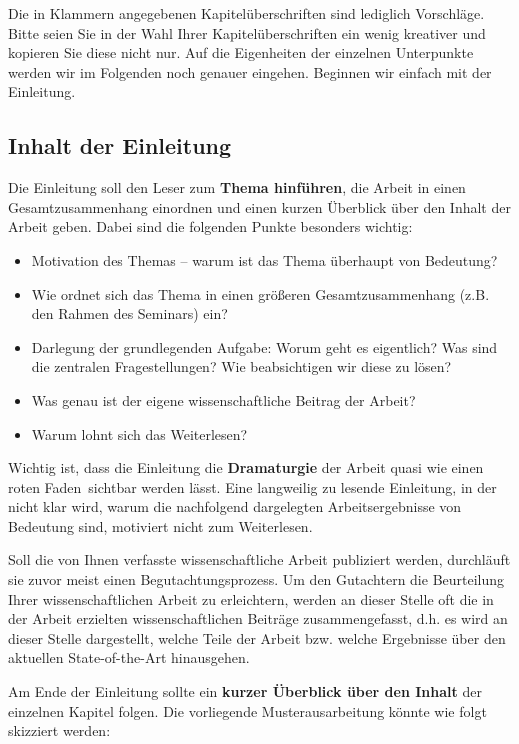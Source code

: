 Die in Klammern angegebenen Kapitelüberschriften sind lediglich \glqq Vorschläge\grqq .
Bitte seien Sie in der Wahl Ihrer Kapitelüberschriften ein wenig kreativer und kopieren Sie diese nicht nur. 
Auf die Eigenheiten der einzelnen Unterpunkte werden wir im Folgenden noch genauer eingehen.
Beginnen wir einfach mit der Einleitung.

\subsection{Inhalt der Einleitung}
Die Einleitung soll den Leser zum {\bf Thema hinführen}, die Arbeit in einen Gesamtzusammenhang einordnen und einen kurzen Überblick über den Inhalt der Arbeit geben. 
Dabei sind die folgenden Punkte besonders wichtig:

\begin{itemize}
\item Motivation des Themas -- warum ist das Thema überhaupt von Bedeutung?
\item Wie ordnet sich das Thema in einen größeren Gesamtzusammenhang (z.B. den Rahmen des Seminars) ein?
\item Darlegung der grundlegenden Aufgabe: Worum geht es eigentlich? Was sind die zentralen Fragestellungen? Wie beabsichtigen wir diese zu lösen?
\item Was genau ist der eigene wissenschaftliche Beitrag der Arbeit?
\item Warum lohnt sich das Weiterlesen? 
\end{itemize}
Wichtig ist, dass die Einleitung die {\bf Dramaturgie} der Arbeit quasi wie einen \glqq roten Faden\grqq\, sichtbar werden lässt.
Eine langweilig zu lesende Einleitung, in der nicht klar wird, warum die nachfolgend dargelegten Arbeitsergebnisse von Bedeutung sind, motiviert nicht zum Weiterlesen.

\bigskip

Soll die von Ihnen verfasste wissenschaftliche Arbeit publiziert werden, durchläuft sie zuvor meist einen Begutachtungsprozess.
Um den Gutachtern die Beurteilung Ihrer wissenschaftlichen Arbeit zu erleichtern, werden an dieser Stelle oft die in der Arbeit erzielten wissenschaftlichen Beiträge zusammengefasst, d.h. es wird an dieser Stelle dargestellt, welche Teile der Arbeit bzw. welche Ergebnisse über den aktuellen State-of-the-Art hinausgehen. 

\bigskip

Am Ende der Einleitung sollte ein \textbf{kurzer Überblick über den Inhalt} der einzelnen Kapitel folgen. 
Die vorliegende Musterausarbeitung könnte wie folgt skizziert werden:

